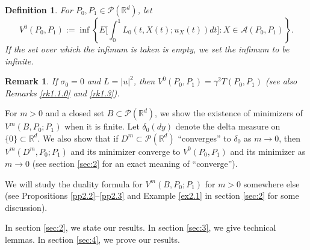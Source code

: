 \documentclass[12pt]{article}
\newtheorem{remark}{Remark}[section]
\newtheorem{definition}{Definition}[section]
\begin{document}
\begin{definition}%

\noindent
For $P_0,P_1\in \mathcal{P}(\mathbb{R}^d )$, let
\begin{equation}\label{1.12}
V^0(P_0,P_1)
:=\inf \left\{E\biggl[\int_0^1 L_0(t,X(t);u_X (t))dt \biggr]:X\in \mathcal{A}(P_0,P_1)\right\}.
\end{equation}
If the set over which the infimum is taken is empty, we set the infimum to be infinite.
\end{definition}

\begin{remark}
If $\sigma_0=0$ and $L=|u|^2$, then $V^0(P_0,P_1)=\gamma^2T(P_0,P_1)$
(see also Remarks \ref{rk1.1.0} and \ref{rk1.3}).

\end{remark}



For $m>0$ and a closed set $B\subset \mathcal{P}(\mathbb{R}^d)$, 
we show the existence of  minimizers of $V^m(B,P_0;P_1)$ when it is finite.
Let $\delta_0(dy)$ denote the delta measure on $\{0\}\subset \mathbb{R}^d$.
We also show that if $D^m\subset \mathcal{P}(\mathbb{R}^d)$ ``converges'' to $\delta_0$
as $m\to 0$, then
$V^{m}(D^m,P_0;P_1)$ and its minimizer converge to $V^0(P_0,P_1)$ and its minimizer as $m\to 0$ 
(see section \ref{sec:2} for an exact meaning of ``converge''). 

We will study the duality formula for $V^m(B,P_0;P_1)$ for $m>0$ somewhere else
(see Propositions \ref{pp2.2}--\ref{pp2.3} and Example \ref{ex2.1} in section \ref{sec:2} for some discussion).

In section \ref{sec:2}, we state our results.
In section \ref{sec:3}, we give technical lemmas.
In section \ref{sec:4}, we prove our results.
\end{document}
